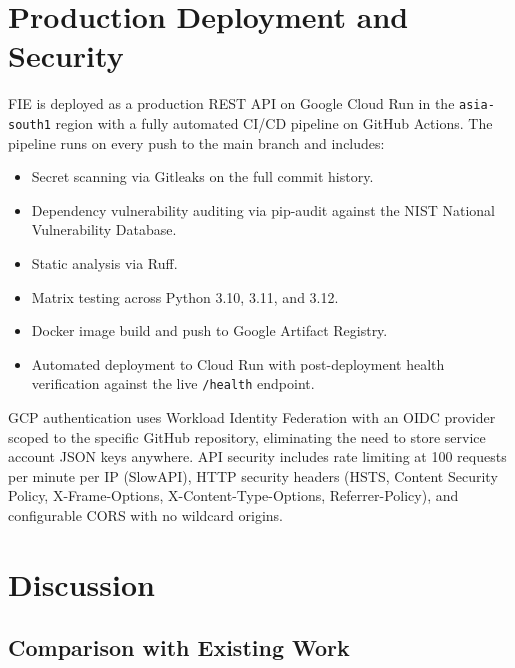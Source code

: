 \documentclass[preprint,12pt,authoryear]{elsarticle}
\begin{document}
\section{Production Deployment and Security}
\label{sec:deployment}

FIE is deployed as a production REST API on Google Cloud Run in the
\texttt{asia-south1} region with a fully automated CI/CD pipeline on
GitHub Actions. The pipeline runs on every push to the main branch and
includes:

\begin{itemize}
  \item Secret scanning via Gitleaks on the full commit history.
  \item Dependency vulnerability auditing via pip-audit against the
        NIST National Vulnerability Database.
  \item Static analysis via Ruff.
  \item Matrix testing across Python 3.10, 3.11, and 3.12.
  \item Docker image build and push to Google Artifact Registry.
  \item Automated deployment to Cloud Run with post-deployment health
        verification against the live \texttt{/health} endpoint.
\end{itemize}

GCP authentication uses Workload Identity Federation with an OIDC
provider scoped to the specific GitHub repository, eliminating the
need to store service account JSON keys anywhere. API security
includes rate limiting at 100 requests per minute per IP (SlowAPI),
HTTP security headers (HSTS, Content Security Policy, X-Frame-Options,
X-Content-Type-Options, Referrer-Policy), and configurable CORS with
no wildcard origins.

\section{Discussion}
\label{sec:discussion}

\subsection{Comparison with Existing Work}
\end{document}

